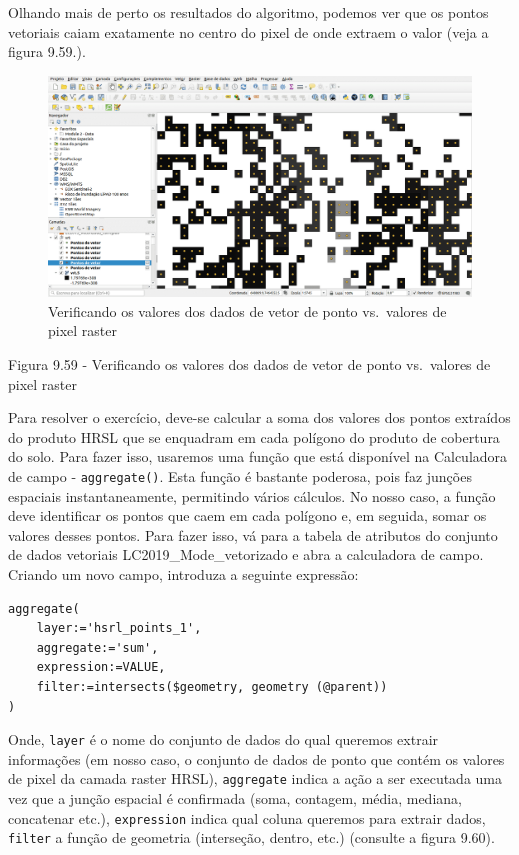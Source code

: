 \documentclass[
]{krantz}
\begin{document}
Olhando mais de perto os resultados do algoritmo, podemos ver que os pontos vetoriais caiam exatamente no centro do pixel de onde extraem o valor (veja a figura 9.59.).

\begin{figure}
\centering
\includegraphics{media/modulo9/fig959.png}
\caption{Verificando os valores dos dados de vetor de ponto vs.~valores de pixel raster}
\end{figure}

Figura 9.59 - Verificando os valores dos dados de vetor de ponto vs.~valores de pixel raster

Para resolver o exercício, deve-se calcular a soma dos valores dos pontos extraídos do produto HRSL que se enquadram em cada polígono do produto de cobertura do solo. Para fazer isso, usaremos uma função que está disponível na Calculadora de campo - \texttt{aggregate()}. Esta função é bastante poderosa, pois faz junções espaciais instantaneamente, permitindo vários cálculos. No nosso caso, a função deve identificar os pontos que caem em cada polígono e, em seguida, somar os valores desses pontos. Para fazer isso, vá para a tabela de atributos do conjunto de dados vetoriais LC2019\_Mode\_vetorizado e abra a calculadora de campo. Criando um novo campo, introduza a seguinte expressão:

\begin{verbatim}
aggregate(
    layer:='hsrl_points_1',
    aggregate:='sum',
    expression:=VALUE,
    filter:=intersects($geometry, geometry (@parent))
)
\end{verbatim}

Onde, \texttt{layer} é o nome do conjunto de dados do qual queremos extrair informações (em nosso caso, o conjunto de dados de ponto que contém os valores de pixel da camada raster HRSL), \texttt{aggregate} indica a ação a ser executada uma vez que a junção espacial é confirmada (soma, contagem, média, mediana, concatenar etc.), \texttt{expression} indica qual coluna queremos para extrair dados, \texttt{filter} a função de geometria (interseção, dentro, etc.) (consulte a figura 9.60).
\end{document}
